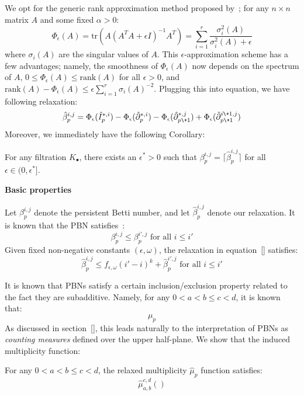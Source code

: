 We opt for the generic rank approximation method proposed by~\cite{}; for any $n \times n$ matrix $A$ and some fixed $\alpha > 0$:
$$ \Phi_\epsilon(A) = \mathrm{tr}\left(A(A^T A + \epsilon I)^{-1} A^T \right ) = \sum\limits_{i=1}^r \frac{\sigma_i^2(A)}{\sigma_i^2(A) + \epsilon} $$
where $\sigma_i(A)$ are the singular values of $A$. This $\epsilon$-approximation scheme has a few advantages; namely, the smoothness of $\Phi_\epsilon(A)$ now depends on the spectrum of $A$, $0 \leq \Phi_\epsilon(A) \leq \mathrm{rank}(A)$ for all $\epsilon > 0$, and $\mathrm{rank}(A) - \Phi_\epsilon(A) \leq \epsilon \sum_{i=1}^r \sigma_i(A)^{-2}$. 
Plugging this into equation, we have following relaxation:
\begin{equation}\label{eq:final_relaxation}
\hat{\beta}_p^{i,j} =  \Phi_\epsilon(\hat{I}_p^{\ast,i}) -  \Phi_\epsilon(\hat{\partial}_p^{\ast,i}) -  \Phi_\epsilon(\hat{\partial}_{p\+1 }^{\ast,j}) + \Phi_\epsilon(\hat{\partial}_{p\+1}^{i \+ 1, j} )
\end{equation}
Moreover, we immediately have the following Corollary:
\begin{corollary}
	For any filtration $K_\bullet$, there exists an $\epsilon^\ast > 0$ such that $\beta_p^{i,j} = \lceil \hat{\beta}_p^{i,j} \rceil$ for all $\epsilon \in (0, \epsilon^\ast]$. 
\end{corollary}

\textbf{Basic properties}
\begin{corollary}
	Let $\beta_p^{i,j}$ denote the persistent Betti number, and let $\hat{\beta}_p^{i,j}$ denote our relaxation. It is known that the PBN satisfies~\cite{}: 
	$$ \beta_p^{i,j} \leq \beta_p^{i',j}  \text{ for all } i \leq i' $$
	Given fixed non-negative constants $(\epsilon, \omega)$, the relaxation in equation~\ref{} satisfies: 
	$$ \hat{\beta}_p^{i,j} \leq f_{\epsilon, \omega}(i' - i)^k  + \hat{\beta}_p^{i',j} \text{ for all } i \leq i'$$
\end{corollary}

It is known that PBNs satisfy a certain inclusion/exclusion property related to the fact they are subadditive. Namely, for any $0 < a < b \leq c < d$, it is known that: 
$$\mu_p^{} $$
As discussed in section~\ref{}, this leads naturally to the interpretation of PBNs as \emph{counting measures} defined over the upper half-plane. We show that the induced multiplicity function:

\begin{corollary}[Subadditivity]
	For any $0 < a < b \leq c < d$, the relaxed multiplicity $\hat{\mu}_p$ function satisfies:
 $$\hat{\mu}_{a, b}^{c,d}(	) $$
\end{corollary}